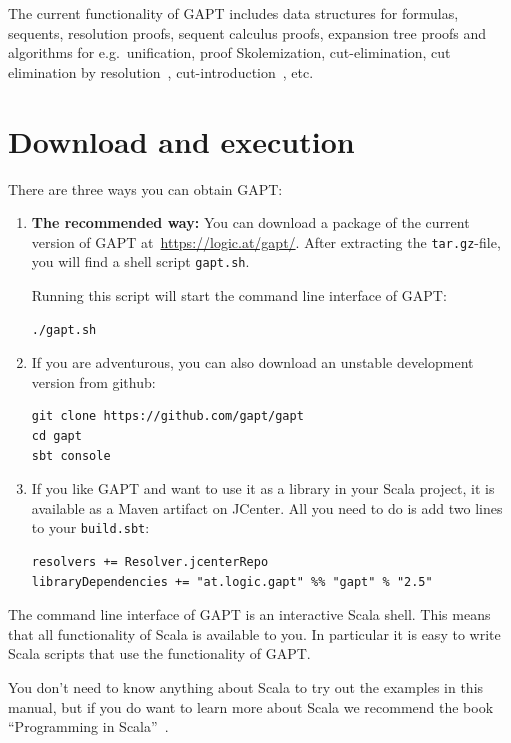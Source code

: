 \documentclass[a4paper,11pt]{article}
\begin{document}
The current functionality of GAPT includes data structures for formulas,
sequents, resolution proofs, sequent calculus proofs, expansion tree proofs and
algorithms for e.g.\ unification, proof Skolemization, cut-elimination, cut
elimination by resolution~\cite{Baaz00CutElimination},
cut-introduction~\cite{Hetzl2012}, etc.

\section{Download and execution}

There are three ways you can obtain GAPT:

\begin{enumerate}

\item {\bfseries The recommended way:}  You can download a package of the current
version of GAPT at~\url{https://logic.at/gapt/}.  After extracting
the \texttt{tar.gz}-file, you will find a shell script \texttt{gapt.sh}.

Running this script will start the command line interface of GAPT:
\begin{lstlisting}
./gapt.sh
\end{lstlisting}

\item If you are adventurous, you can also download an unstable development
  version from github:
\begin{lstlisting}
git clone https://github.com/gapt/gapt
cd gapt
sbt console
\end{lstlisting}

\item If you like GAPT and want to use it as a library in your Scala project,
  it is available as a Maven artifact on JCenter.  All you need to do is add
  two lines to your \verb,build.sbt,:
\begin{lstlisting}
resolvers += Resolver.jcenterRepo
libraryDependencies += "at.logic.gapt" %% "gapt" % "2.5"
\end{lstlisting}

\end{enumerate}

The command line interface of GAPT is an interactive Scala shell.  This means
that all functionality of Scala is available to you.  In particular it is easy
to write Scala scripts that use the functionality of GAPT.

You don't need to know anything about Scala to try out the examples in this
manual, but if you do want to learn more about Scala we recommend the book
``Programming in Scala''~\cite{odersky2008programming}.
\end{document}
